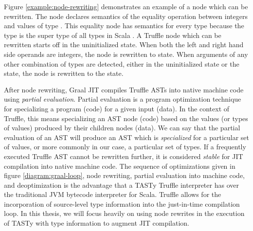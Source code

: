 Figure \ref{example:node-rewriting} demonstrates an example of a node which can be rewritten.
The node declares semantics of the equality operation between integers and values of type .
This equality node has semantics for every type because the  type is the super type of all types in Scala .
A Truffle node which can be rewritten starts off in the uninitialized state.
When both the left and right hand side operands are integers, the node is rewritten to  state.
When arguments of any other combination of types are detected, either in the uninitialized state or the  state, the node is rewritten to the  state.

After node rewriting, Graal JIT compiles Truffle ASTs into native machine code using \textit{partial evaluation}.
Partial evaluation is a program optimization technique for specializing a program (code) for a given input (data)\cite{futamura:partial-eval}.
In the context of Truffle, this means specializing an AST node (code) based on the values (or types of values) produced by their children nodes (data)\cite{truffle:partial-eval}.
We can say that the partial evaluation of an AST  will produce an AST which is \textit{specialized} for a particular set of values, or more commonly in our case, a particular set of types.
If a frequently executed Truffle AST cannot be rewritten further, it is considered \textit{stable} for JIT compilation into native machine code.  
The sequence of optimizations given in figure \ref{diagram:graal-loop}, node rewriting, partial evaluation into machine code, and deoptimization is the advantage that a TASTy Truffle interpreter has over the traditional JVM bytecode interpreter for Scala.
Truffle allows for the incorporation of source-level type information into the just-in-time compilation loop.
In this thesis, we will focus heavily on using node rewrites in the execution of TASTy with type information to augment JIT compilation.

